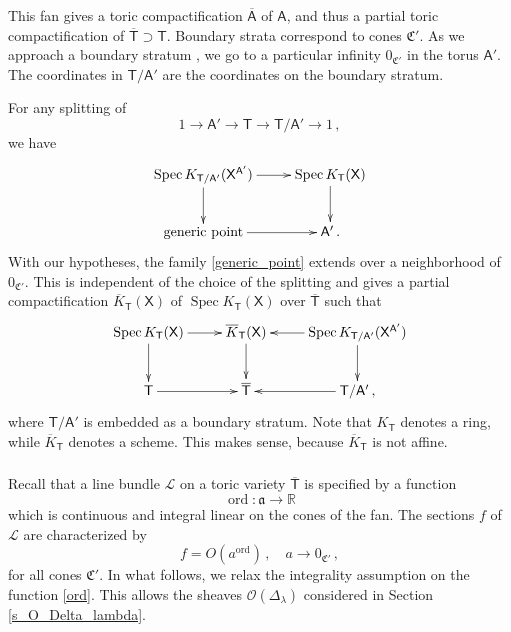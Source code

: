 \documentclass[14pt]{extarticle}
\newcommand{\R}{\mathbb{R}}
\newcommand{\bT}{\mathsf{T}}
\newcommand{\bA}{\mathsf{A}}
\newcommand{\bAb}{\overline{\bA}}
\newcommand{\bX}{\mathsf{X}}
\newcommand{\cL}{\mathscr{L}}
\newcommand{\fC}{\mathfrak{C}}
\newcommand{\bTb}{\overline{\bT}}
\newcommand{\cO}{\mathscr{O}}
\newcommand{\fa}{\mathfrak{a}}
\DeclareMathOperator{\Spec}{Spec}
\DeclareMathOperator{\ord}{ord}
\theoremstyle{definition}
\newcommand{\Kbar}{\overline{K}}
\begin{document}
This fan gives a
toric compactification $\bAb$ of $\bA$, and thus a partial toric
compactification of $\bTb \supset \bT$.  Boundary strata correspond to
cones $\fC'$. As we approach a boundary
stratum
, we go to a particular infinity
$0_{\fC'}$ in
the torus $\bA'$. The coordinates in $\bT/\bA'$ are the coordinates
on the boundary stratum. 

For any splitting of 
%
\begin{equation}
  \label{TTT}
  1 \to \bA' \to \bT \to \bT/\bA' \to 1  \,, 
\end{equation}
%
we have
%
\begin{equation}
  \xymatrix{
      \Spec K_{\bT/\bA'}(\bX^{\bA'}) \ar[r] \ar[d] &   \Spec
      K_{\bT}(\bX) \ar[d] \\
     \textup{generic point}
      \ar[r] & \bA'  \,. 
  }\label{generic_point}
\end{equation}
%
With our hypotheses, the family \eqref{generic_point} extends over a neighborhood of  $0_{\fC'}$.
This is independent of the choice of the splitting 
and gives a partial compactification $\Kbar_\bT(\bX)$  of $\Spec
      K_{\bT}(\bX)$ over
$\bTb$  such
that 
%
\begin{equation}
  \xymatrix{
      \Spec
      K_{\bT}(\bX) \ar[d] \ar[r] & \Kbar_\bT(\bX) \ar[d] & 
      \Spec K_{\bT/\bA'}(\bX^{\bA'})  \ar[d] \ar[l] \\
     \bT \ar[r]  & \bTb &   \ar[l] \bT/\bA' \,, 
  } \label{KbarX} 
\end{equation}
%
where $\bT/\bA'$ is embedded as a boundary stratum. Note that
$K_\bT$ denotes a ring, while $\Kbar_\bT$ denotes a scheme. This makes
sense, because $\Kbar_\bT$ is not affine.

\subsubsection{}

Recall that a line bundle $\cL$ on a toric variety $\bTb$ is specified
by a function
%
\begin{equation}
\ord: \fa \to \R\label{ord}
\end{equation}
%
which is continuous and integral linear on the cones of the fan. The sections
$f$ of
$\cL$ are characterized by
$$
f = O(a^{\ord})\,, \quad a\to 0_{\fC'} \,, 
$$
for all cones $\fC'$. In what follows, we relax the integrality assumption
on the function \eqref{ord}. This allows the 
sheaves $\cO(\Delta_\lambda)$ considered in Section
\ref{s_O_Delta_lambda}.
\end{document}
